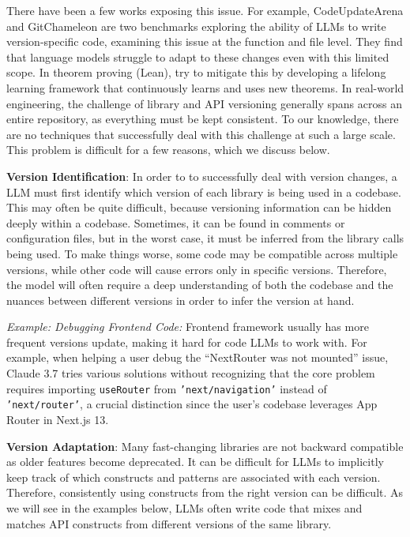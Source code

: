 There have been a few works exposing this issue. For example, CodeUpdateArena \citep{liu2024codeupdatearena} and GitChameleon \citep{islah2024gitchameleon} are two benchmarks exploring the ability of LLMs to write version-specific code, examining this issue at the function and file level. They find that language models struggle to adapt to these changes even with this limited scope. In theorem proving (Lean), \citet{kumarappan2024leanagent} try to mitigate this by developing a lifelong learning framework that continuously learns and uses new theorems. In real-world engineering, the challenge of library and API versioning generally spans across an entire repository, as everything must be kept consistent. To our knowledge, there are no techniques that successfully deal with this challenge at such a large scale. This problem is difficult for a few reasons, which we discuss below. 

\textbf{Version Identification}: In order to to successfully deal with version changes, a LLM must first identify which version of each library is being used in a codebase. This may often be quite difficult, because versioning information can be hidden deeply within a codebase. Sometimes, it can be found in comments or configuration files, but in the worst case, it must be inferred from the library calls being used. To make things worse, some code may be compatible across multiple versions, while other code will cause errors only in specific versions. Therefore, the model will often require a deep understanding of both the codebase and the nuances between different versions in order to infer the version at hand.

\begin{tcolorbox}[colback=lightblue, boxrule=0pt, arc=5pt, outer arc=5pt, after skip=10pt plus 2pt]
\textit{Example: Debugging Frontend Code:} Frontend framework usually has more frequent versions update, making it hard for code LLMs to work with. For example, when helping a user debug the ``NextRouter was not mounted'' issue, Claude 3.7 tries various solutions without recognizing that the core problem requires importing \texttt{useRouter} from \texttt{'next/navigation'} instead of \texttt{'next/router'}, a crucial distinction since the user's codebase leverages App Router in Next.js 13.
\end{tcolorbox}


\textbf{Version Adaptation}: Many fast-changing libraries are not backward compatible as older features become deprecated. It can be difficult for LLMs to implicitly keep track of which constructs and patterns are associated with each version. Therefore, consistently using constructs from the right version can be difficult. As we will see in the examples below, LLMs often write code that mixes and matches API constructs from different versions of the same library. 


